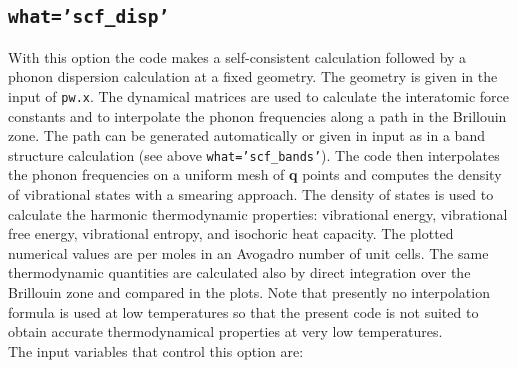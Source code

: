 \documentclass[12pt,a4paper]{article}
\begin{document}
\subsection{\texttt{what='scf\_disp'}}
With this option the code makes a self-consistent calculation followed by
a phonon dispersion calculation at a fixed geometry. The geometry is given in the 
input of \texttt{pw.x}. The dynamical matrices are used to calculate 
the interatomic force constants and to interpolate the phonon frequencies 
along a path in the Brillouin zone. The path can be generated automatically 
or given in input as in a band structure calculation (see above \texttt{what='scf\_bands'}). The code then 
interpolates the phonon frequencies on a uniform mesh of {\bf q} points and computes the 
density of vibrational states with a smearing approach. The density of 
states is used to calculate the harmonic thermodynamic properties: 
vibrational energy, vibrational free energy, vibrational entropy, and 
isochoric heat capacity.
The plotted numerical values are per moles in an Avogadro number of unit 
cells. The same thermodynamic quantities are calculated also by direct 
integration over the Brillouin zone and compared in the plots.
Note that presently no interpolation formula is used at low temperatures
so that the present code is not suited to obtain accurate thermodynamical 
properties at very low temperatures. \\
The input variables that control this option are:
\end{document}
